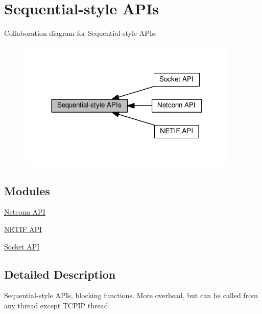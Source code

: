 \hypertarget{group__sequential__api}{}\section{Sequential-\/style A\+P\+Is}
\label{group__sequential__api}
Collaboration diagram for Sequential-\/style A\+P\+Is\+:
\nopagebreak
\begin{figure}[H]
\begin{center}
\leavevmode
\includegraphics[width=300pt]{group__sequential__api}
\end{center}
\end{figure}
\subsection*{Modules}
\begin{DoxyCompactItemize}
\item 
\hyperlink{group__netconn}{Netconn A\+PI}
\item 
\hyperlink{group__netifapi}{N\+E\+T\+I\+F A\+PI}
\item 
\hyperlink{group__socket}{Socket A\+PI}
\end{DoxyCompactItemize}


\subsection{Detailed Description}
Sequential-\/style A\+P\+Is, blocking functions. More overhead, but can be called from any thread except T\+C\+P\+IP thread. 